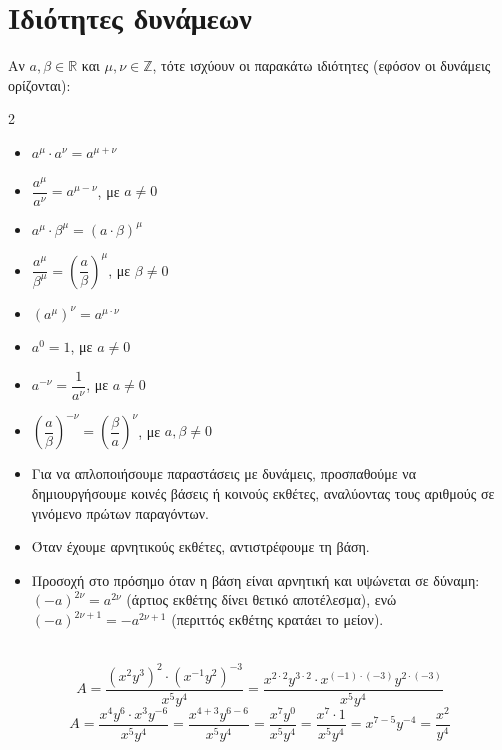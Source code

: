 \section{Ιδιότητες δυνάμεων}

Αν $a, \beta \in \mathbb{R}$ και $\mu, \nu \in \mathbb{Z}$, τότε ισχύουν οι παρακάτω ιδιότητες (εφόσον οι δυνάμεις ορίζονται):
\begin{multicols}{2}
\begin{itemize}[label=\faEdit]
    \item $a^\mu \cdot a^\nu = a^{\mu+\nu}$
    \item $\dfrac{a^\mu}{a^\nu} = a^{\mu-\nu}$, με $a \neq 0$
    \item $a^\mu \cdot \beta^\mu = (a \cdot \beta)^\mu$
    \item $\dfrac{a^\mu}{\beta^\mu} = \left(\dfrac{a}{\beta}\right)^\mu$, με $\beta \neq 0$
    \item $(a^\mu)^\nu = a^{\mu \cdot \nu}$
    \item $a^0 = 1$, με $a \neq 0$
    \item $a^{-\nu} = \dfrac{1}{a^\nu}$, με $a \neq 0$
    \item $\left(\dfrac{a}{\beta}\right)^{-\nu} = \left(\dfrac{\beta}{a}\right)^\nu$, με $a, \beta \neq 0$
\end{itemize}
\end{multicols}

\begin{itemize}
    \item Για να απλοποιήσουμε παραστάσεις με δυνάμεις, προσπαθούμε να δημιουργήσουμε κοινές βάσεις ή κοινούς εκθέτες, αναλύοντας τους αριθμούς σε γινόμενο πρώτων παραγόντων.
    \item Όταν έχουμε αρνητικούς εκθέτες, αντιστρέφουμε τη βάση.
    \item Προσοχή στο πρόσημο όταν η βάση είναι αρνητική και υψώνεται σε δύναμη: $(-a)^{2\nu} = a^{2\nu}$ (άρτιος εκθέτης δίνει θετικό αποτέλεσμα), ενώ $(-a)^{2\nu+1} = -a^{2\nu+1}$ (περιττός εκθέτης κρατάει το μείον).
\end{itemize}


\\
\lysh
\[ A = \dfrac{(x^2 y^3)^2 \cdot (x^{-1} y^2)^{-3}}{x^5 y^4} = \dfrac{x^{2\cdot2} y^{3\cdot2} \cdot x^{(-1)\cdot(-3)} y^{2\cdot(-3)}}{x^5 y^4} \]
\[ A = \dfrac{x^4 y^6 \cdot x^3 y^{-6}}{x^5 y^4} = \dfrac{x^{4+3} y^{6-6}}{x^5 y^4} = \dfrac{x^7 y^0}{x^5 y^4} = \dfrac{x^7 \cdot 1}{x^5 y^4} = x^{7-5} y^{-4} = \dfrac{x^2}{y^4} \]

